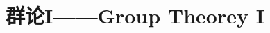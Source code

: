\documentclass[../main.tex]{subfiles} %
\begin{document}
\chapter{群论I——Group Theorey I}













% 

% 

% 

% 
\end{document}

